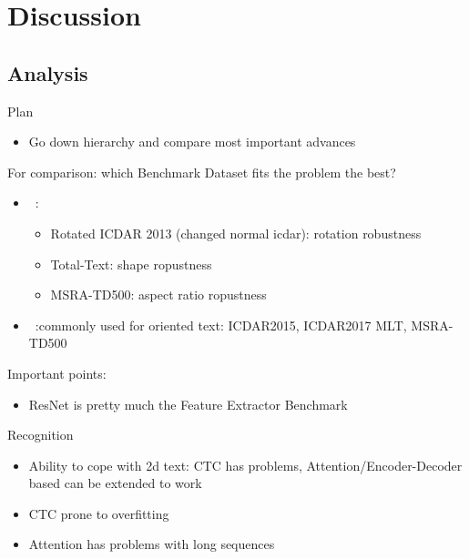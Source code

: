 \chapter{Discussion}\label{ch:discussion}
\section{Analysis}
Plan
\begin{itemize}
    \item Go down hierarchy and compare most important advances
\end{itemize}

For comparison: which Benchmark Dataset fits the problem the best?
\begin{itemize}
    \item~\cite{liao_mask_2020}:
        \begin{itemize}
            \item Rotated ICDAR 2013 (changed normal icdar): rotation robustness
            \item Total-Text: shape ropustness
            \item MSRA-TD500: aspect ratio ropustness
        \end{itemize}
    \item~\cite{yang_learning_2021}:commonly used for oriented text: ICDAR2015, ICDAR2017 MLT, MSRA-TD500
\end{itemize}

Important points:
\begin{itemize}
    \item ResNet is pretty much the Feature Extractor Benchmark
\end{itemize}

Recognition
\begin{itemize}
    \item Ability to cope with 2d text:
        CTC has problems,
        Attention/Encoder-Decoder based can be extended to work
    \item CTC prone to overfitting
    \item Attention has problems with long sequences
\end{itemize}

